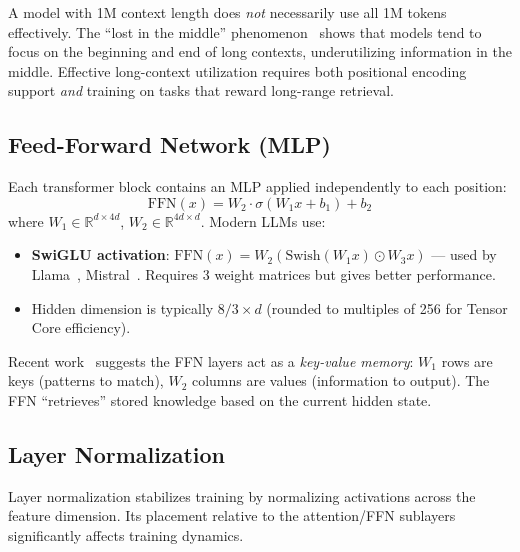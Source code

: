 \begin{warningbox}
A model with 1M context length does \emph{not} necessarily use all 1M tokens effectively. The ``lost in the middle'' phenomenon~\cite{liu2024lost} shows that models tend to focus on the beginning and end of long contexts, underutilizing information in the middle. Effective long-context utilization requires both positional encoding support \emph{and} training on tasks that reward long-range retrieval.
\end{warningbox}

\subsection{Feed-Forward Network (MLP)}
\label{feed-forward-network-mlp}

Each transformer block contains an MLP applied independently to each position: 
\[
\text{FFN}(x) = W_2 \cdot \sigma(W_1 x + b_1) + b_2
\]
 where $W_1 \in \mathbb{R}^{d \times 4d}$, $W_2 \in \mathbb{R}^{4d \times d}$. Modern LLMs use:

\begin{itemize}
  \item \textbf{SwiGLU activation}: $\text{FFN}(x) = W_2 (\text{Swish}(W_1 x) \odot W_3 x)$ --- used by Llama~\cite{grattafiori2024llama3}, Mistral~\cite{jiang2023mistral}. Requires 3 weight matrices but gives better performance.
  \item Hidden dimension is typically $8/3 \times d$ (rounded to multiples of 256 for Tensor Core efficiency).
\end{itemize}

\begin{intuitionbox}
Recent work~\cite{geva2021transformer} suggests the FFN layers act as a \emph{key-value memory}: $W_1$ rows are keys (patterns to match), $W_2$ columns are values (information to output). The FFN ``retrieves'' stored knowledge based on the current hidden state.
\end{intuitionbox}

\subsection{Layer Normalization}
\label{layer-normalization}

Layer normalization stabilizes training by normalizing activations across the feature dimension. Its placement relative to the attention/FFN sublayers significantly affects training dynamics.

